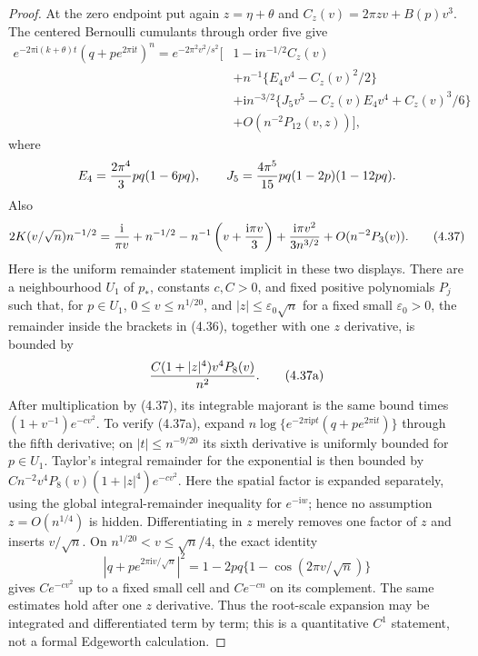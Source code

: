 \documentclass[11pt,a4paper]{article}
\numberwithin{equation}{section}
\theoremstyle{definition}
\theoremstyle{remark}
\newcommand{\ii}{\mathrm i}
\begin{document}
\begin{proof}
At the zero endpoint put again $z=\eta+\theta$ and
$C_z(v)=2\pi zv+B(p)v^3$.  The centered Bernoulli cumulants through order
five give
\begin{equation}\tag{4.36}
\begin{split}
 e^{-2\pi\ii(k+\theta)t}(q+pe^{2\pi\ii t})^n
 =e^{-2\pi^2v^2/s^2}\big[&1-\ii n^{-1/2}C_z(v)\\
 &+n^{-1}\{E_4v^4-C_z(v)^2/2\}\\
 &+\ii n^{-3/2}\{J_5v^5-C_z(v)E_4v^4+C_z(v)^3/6\}\\
 &+O(n^{-2}P_{12}(v,z))\big],
\end{split}
\end{equation}
where
\[
 E_4={2\pi^4\over3}pq(1-6pq),\qquad
 J_5={4\pi^5\over15}pq(1-2p)(1-12pq).
\]
Also
\[
 2K(v/\sqrt n)n^{-1/2}
 ={\ii\over\pi v}+n^{-1/2}
 -n^{-1}\left(v+{\ii\pi v\over3}\right)
 +{\ii\pi v^2\over3n^{3/2}}+O(n^{-2}P_3(v)).          \tag{4.37}
\]
Here is the uniform remainder statement implicit in these two displays.
There are a neighbourhood $U_1$ of $p_*$, constants $c,C>0$, and fixed
positive polynomials $P_j$ such that, for $p\in U_1$,
$0\le v\le n^{1/20}$, and $|z|\le\varepsilon_0\sqrt n$ for a fixed
small $\varepsilon_0>0$, the remainder inside the
brackets in (4.36), together with one $z$ derivative, is bounded by
\[
 {C(1+|z|^4)v^4P_{8}(v)\over n^2}.                    \tag{4.37a}
\]
After multiplication by (4.37), its integrable majorant is the same
bound times $(1+v^{-1})e^{-cv^2}$.  To verify (4.37a), expand
$n\log\{e^{-2\pi\ii pt}(q+pe^{2\pi\ii t})\}$ through the fifth
derivative; on $|t|\le n^{-9/20}$ its sixth derivative is uniformly
bounded for $p\in U_1$.  Taylor's integral remainder for the exponential
is then bounded by
$Cn^{-2}v^4P_8(v)(1+|z|^4)e^{-cv^2}$.  Here the spatial factor is
expanded separately, using the global integral-remainder inequality for
$e^{-\ii w}$; hence no assumption $z=O(n^{1/4})$ is hidden.
Differentiating in $z$ merely removes one factor of $z$ and inserts
$v/\sqrt n$.  On
$n^{1/20}<v\le\sqrt n/4$, the exact identity
\[
 |q+pe^{2\pi\ii v/\sqrt n}|^2
 =1-2pq\{1-\cos(2\pi v/\sqrt n)\}
\]
gives $Ce^{-cv^2}$ up to a fixed small cell and $Ce^{-cn}$ on its
complement.  The same estimates hold after one $z$ derivative.  Thus the
root-scale expansion may be integrated and differentiated term by term;
this is a quantitative $C^1$ statement, not a formal Edgeworth
calculation.


\end{proof}
\end{document}
